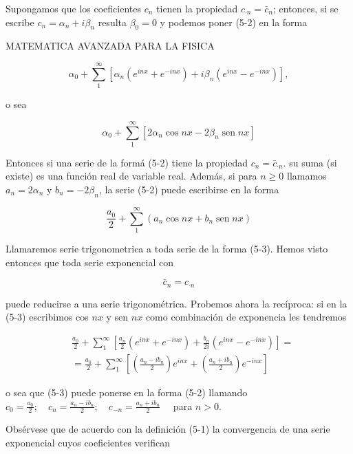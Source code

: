 \documentclass[10pt]{article}
\theoremstyle{plain}
\theoremstyle{definition}
\theoremstyle{remark}
\begin{document}
Supongamos que los coeficientes $c_{n}$ tienen la propiedad $c_{\cdot n}=\bar{c}_{n}$; entonces, si se escribe $c_{n}=\alpha_{n}+i \beta_{n}$ resulta $\beta_{0}=0$ y podemos poner (5-2) en la forma

MATEMATICA AVANZADA PARA LA FISICA

$$
\alpha_{0}+\sum_{1}^{\infty}\left[\alpha_{n}\left(e^{i n x}+e^{-i n x}\right)+i \beta_{n}\left(e^{i n x}-e^{-i n x}\right)\right],
$$

o sea

$$
\alpha_{0}+\sum_{1}^{\infty}\left[2 \alpha_{n} \cos n x-2 \beta_{n} \operatorname{sen} n x\right]
$$

Entonces si una serie de la formá (5-2) tiene la propiedad $c_{n}=\bar{c}_{\cdot n}$. su suma (si existe) es una función real de variable real. Además, si para $n \geqslant 0$ llamamos $a_{n}=2 \alpha_{n}$ y $b_{n}=-2 \beta_{n}$, la serie (5-2) puede escribirse en la forma


\begin{equation*}
\frac{a_{0}}{2}+\sum_{1}^{\infty}\left(a_{n} \cos n x+b_{n} \operatorname{sen} n x\right) \tag{$5\cdot3$}
\end{equation*}


Llamaremos serie trigonometrica a toda serie de la forma (5-3). Hemos visto entonces que toda serie exponencial con


\begin{equation*}
\bar{c}_{n}=c_{\cdot n} \tag{5-4}
\end{equation*}


puede reducirse a una serie trigonométrica. Probemos ahora la recíproca: si en la (5-3) escribimos cos $n x$ y sen $n x$ como combinación de exponencia les tendremos

$$
\begin{aligned}
& \frac{a_{0}}{2}+\sum_{1}^{\infty}\left[\frac{a_{n}}{2}\left(e^{i n x}+e^{-i n x}\right)+\frac{b_{n}}{2 i}\left(e^{i n x}-e^{-i n x}\right)\right]= \\
& =\frac{a_{0}}{2}+\sum_{1}^{\infty}\left[\left(\frac{a_{n}-i b_{n}}{2}\right) e^{i n x}+\left(\frac{a_{n}+i b_{n}}{2}\right) e^{-i n x}\right]
\end{aligned}
$$

o sea que (5-3) puede ponerse en la forma (5-2) llamando\\
$c_{0}=\frac{a_{0}}{2} ; \quad c_{n}=\frac{a_{n}-i b_{n}}{2} ; \quad c_{-n}=\frac{a_{n}+i b_{n}}{2} \quad$ para $n>0$.

Obsérvese que de acuerdo con la definición (5-1) la convergencia de una serie exponencial cuyos coeficientes verifican
\end{document}
